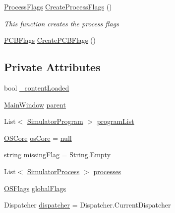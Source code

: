 \begin{DoxyCompactItemize}
\item 
\hyperlink{struct_c_p_u___o_s___simulator_1_1_operating___system_1_1_process_flags}{Process\+Flags} \hyperlink{class_c_p_u___o_s___simulator_1_1_operating_system_main_window_aa44b77efc3ae2c300ebb19e6854c3290}{Create\+Process\+Flags} ()
\begin{DoxyCompactList}\small\item\em This function creates the process flags \end{DoxyCompactList}\item 
\hyperlink{struct_c_p_u___o_s___simulator_1_1_operating___system_1_1_p_c_b_flags}{P\+C\+B\+Flags} \hyperlink{class_c_p_u___o_s___simulator_1_1_operating_system_main_window_a0994a475aa1e602964f610cce778b117}{Create\+P\+C\+B\+Flags} ()
\end{DoxyCompactItemize}
\subsection*{Private Attributes}
\begin{DoxyCompactItemize}
\item 
bool \hyperlink{class_c_p_u___o_s___simulator_1_1_operating_system_main_window_a824bac181aa4f034115dfac40c744738}{\+\_\+content\+Loaded}
\item 
\hyperlink{class_c_p_u___o_s___simulator_1_1_main_window}{Main\+Window} \hyperlink{class_c_p_u___o_s___simulator_1_1_operating_system_main_window_a0219ba1583d00852bea36ac27c9d878d}{parent}
\item 
List$<$ \hyperlink{class_c_p_u___o_s___simulator_1_1_c_p_u_1_1_simulator_program}{Simulator\+Program} $>$ \hyperlink{class_c_p_u___o_s___simulator_1_1_operating_system_main_window_a83bef5323931616842c44d3f8d477fd2}{program\+List}
\item 
\hyperlink{class_c_p_u___o_s___simulator_1_1_operating___system_1_1_o_s_core}{O\+S\+Core} \hyperlink{class_c_p_u___o_s___simulator_1_1_operating_system_main_window_af944b743b4780850089320d08d38b0ed}{os\+Core} = \hyperlink{_old_01_process_01_flags_8cs_afb8e110345c45e74478894341ab6b28e}{null}
\item 
string \hyperlink{class_c_p_u___o_s___simulator_1_1_operating_system_main_window_ad3dd5030de453dd97f236e7677ab6732}{missing\+Flag} = String.\+Empty
\item 
List$<$ \hyperlink{class_c_p_u___o_s___simulator_1_1_operating___system_1_1_simulator_process}{Simulator\+Process} $>$ \hyperlink{class_c_p_u___o_s___simulator_1_1_operating_system_main_window_ab6bcbc8c33ec438d2f005d4c978e1a44}{processes}
\item 
\hyperlink{struct_c_p_u___o_s___simulator_1_1_operating___system_1_1_o_s_flags}{O\+S\+Flags} \hyperlink{class_c_p_u___o_s___simulator_1_1_operating_system_main_window_a905f81a88e7878e936352f6da9ffcb93}{global\+Flags}
\item 
Dispatcher \hyperlink{class_c_p_u___o_s___simulator_1_1_operating_system_main_window_ac0f8e9dfcaba558927c53e11815fb0fb}{dispatcher} = Dispatcher.\+Current\+Dispatcher
\end{DoxyCompactItemize}


